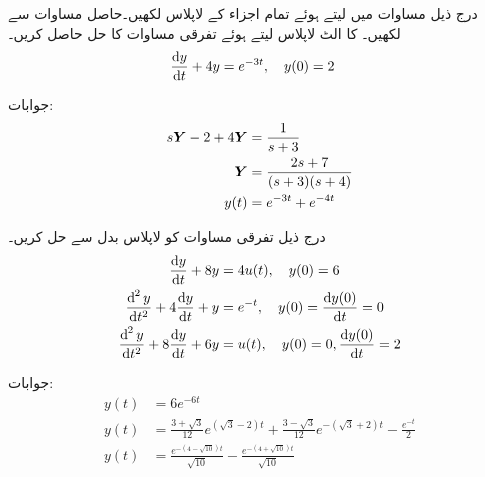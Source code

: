 درج ذیل مساوات میں  لیتے ہوئے تمام اجزاء کے لاپلاس لکھیں۔حاصل مساوات سے  لکھیں۔ کا الٹ لاپلاس لیتے ہوئے تفرقی مساوات کا حل  حاصل کریں۔ 
\begin{align*}
\frac{\dif y}{\dif t}+4y&=e^{-3t}, \quad y(0)=2
\end{align*}

جوابات:
\begin{align*}
s{{\boldsymbol{Y}}}-2+4{{\boldsymbol{Y}}}&=\frac{1}{s+3}\\
{{\boldsymbol{Y}}}&=\frac{2s+7}{(s+3)(s+4)}\\
y(t)&=e^{-3t}+e^{-4t}
\end{align*}

درج ذیل تفرقی مساوات کو لاپلاس بدل سے حل کریں۔
\begin{align*}
\frac{\dif y}{\dif t}+8y&=4u(t), \quad y(0)=6\\
\frac{\dif^{\,2}y}{\dif t^2}+4 \frac{\dif y}{\dif t} +y&=e^{-t}, \quad y(0)=\frac{\dif y(0)}{\dif t}=0\\
\frac{\dif^{\,2}y}{\dif t^2}+8 \frac{\dif y}{\dif t} +6y&=u(t), \quad y(0)=0, \frac{\dif y(0)}{\dif t}=2
\end{align*}

جوابات:
\begin{align*}
y(t)&=6e^{-6t}\\
y(t)&=\frac{3+\sqrt{3}}{12}e^{(\sqrt{3}-2)t}+\frac{3-\sqrt{3}}{12}e^{-(\sqrt{3}+2)t}-\frac{e^{-t}}{2}\\
y(t)&=\frac{e^{-(4-\sqrt{10})t}}{\sqrt{10}}-\frac{e^{-(4+\sqrt{10})t}}{\sqrt{10}}
\end{align*}

